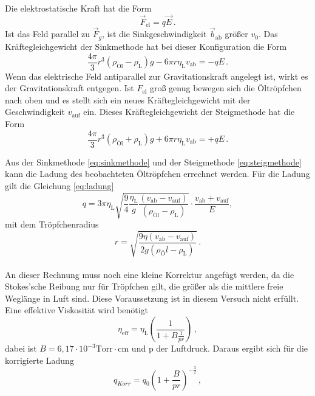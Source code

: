 Die elektrostatische Kraft hat die Form 
\begin{equation*}
    \vec{F}_\text{el} = q \vec{E}\, .
    \label{eq:Estat}
\end{equation*}
Ist das Feld parallel zu $\vec{F}_g$, ist die Sinkgeschwindigkeit $\vec{b}_\text{ab}$ größer $v_0$.
Das Kräftegleichgewicht der Sinkmethode hat bei dieser Konfiguration die Form 
\begin{equation}
    \frac{4 \pi}{3} r^3(\rho_\text{Öl} - \rho_\text{L})g - 6 \pi r \eta_\text{L} v_\text{ab} = - q E \, .
    \label{eq:sinkmethode}
\end{equation}
Wenn das elektrische Feld antiparallel zur Gravitationskraft angelegt ist, wirkt es der Gravitationskraft entgegen.
Ist $F_\text{el}$ groß genug bewegen sich die Öltröpfchen nach oben und es stellt sich ein neues Kräftegleichgewicht mit der Geschwindigkeit $v_\text{auf}$ ein.
Dieses Kräftegleichgewicht der Steigmethode hat die Form
\begin{equation}
    \frac{4 \pi}{3} r^3(\rho_\text{Öl} + \rho_\text{L})g + 6 \pi r \eta_\text{L} v_\text{ab} = + q E \, .
    \label{eq:steigmethode}
\end{equation}

Aus der Sinkmethode \eqref{eq:sinkmethode} und der Steigmethode \eqref{eq:steigmethode} kann die Ladung des beobachteten Öltröpfchen errechnet werden.
Für die Ladung gilt die Gleichung \eqref{eq:ladung}
\begin{equation}
    q = 3 \pi \eta_\text{L} \sqrt{\frac{9}{4} \frac{\eta_\text{L}}{g} \frac{(v_\text{ab} - v_\text{auf})}{(\rho_\text{Öl} - \rho_\text{L})}} \cdot \frac{v_\text{ab}+ v_\text{auf}}{E} ,
    \label{eq:ladung}
\end{equation}
mit dem Tröpfchenradius 
\begin{equation}
    r = \sqrt{\frac{9 \eta (v_\text{ab}-v_\text{auf})}{2 g (\rho_Öl - \rho_\text{L})}}\, .
    \label{eq:rmitEfled}
\end{equation} \\

An dieser Rechnung muss noch eine kleine Korrektur angefügt werden, da die Stokes'sche Reibung nur für Tröpfchen gilt, die größer als die mittlere freie Weglänge in Luft sind.
Diese Voraussetzung ist in diesem Versuch nicht erfüllt. Eine effektive Viskosität wird benötigt
\begin{equation}
    \eta_\text{eff} = \eta_\text{L} \left( \frac{1}{1+ B \frac{1}{p r}}       \right) \, ,
    \label{eq:Veff}
\end{equation}
dabei ist $B = 6,17 \cdot 10^{-3} \text{Torr} \cdot \unit{\centi\meter}$ und p der Luftdruck. Daraus ergibt sich für die korrigierte Ladung
\begin{equation}
    q_{Korr} = q_0 \left(1 + \frac{B}{p r}\right)^{-\frac{3}{2}}  \, ,
    \label{eq:qKorr}
\end{equation}
